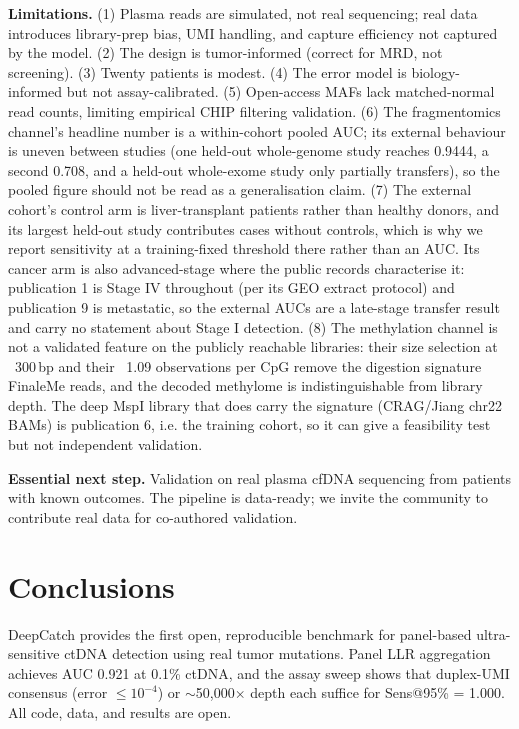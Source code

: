 \documentclass[11pt]{article}
\begin{document}
\textbf{Limitations.} (1) Plasma reads are simulated, not real sequencing; real data introduces library-prep bias, UMI handling, and capture efficiency not captured by the model. (2) The design is tumor-informed (correct for MRD, not screening). (3) Twenty patients is modest. (4) The error model is biology-informed but not assay-calibrated. (5) Open-access MAFs lack matched-normal read counts, limiting empirical CHIP filtering validation. (6) The fragmentomics channel's headline number is a within-cohort pooled AUC; its external behaviour is uneven between studies (one held-out whole-genome study reaches 0.9444, a second 0.708, and a held-out whole-exome study only partially transfers), so the pooled figure should not be read as a generalisation claim. (7) The external cohort's control arm is liver-transplant patients rather than healthy donors, and its largest held-out study contributes cases without controls, which is why we report sensitivity at a training-fixed threshold there rather than an AUC. Its cancer arm is also advanced-stage where the public records characterise it: publication 1 is Stage IV throughout (per its GEO extract protocol) and publication 9 is metastatic, so the external AUCs are a late-stage transfer result and carry no statement about Stage I detection. (8) The methylation channel is not a validated feature on the publicly reachable libraries: their size selection at ~300\,bp and their ~1.09 observations per CpG remove the digestion signature FinaleMe reads, and the decoded methylome is indistinguishable from library depth. The deep MspI library that does carry the signature (CRAG/Jiang chr22 BAMs) is publication 6, i.e. the training cohort, so it can give a feasibility test but not independent validation.

\textbf{Essential next step.} Validation on real plasma cfDNA sequencing from patients with known outcomes. The pipeline is data-ready; we invite the community to contribute real data for co-authored validation.

\section{Conclusions}
\label{sec:conclusions}

DeepCatch provides the first open, reproducible benchmark for panel-based ultra-sensitive ctDNA detection using real tumor mutations. Panel LLR aggregation achieves AUC 0.921 at 0.1\% ctDNA, and the assay sweep shows that duplex-UMI consensus (error $\le 10^{-4}$) or $\sim$50,000$\times$ depth each suffice for Sens@95\% = 1.000. All code, data, and results are open.
\end{document}
